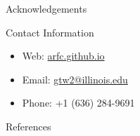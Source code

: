 \documentclass[final]{beamer}
\newlength{\onecolwid}
\newlength{\threecolwid}
\begin{document}
\begin{frame}[t]
\begin{columns}[t,totalwidth=\threecolwid]
\begin{column}{\onecolwid}
\begin{block}{Acknowledgements}
	
\end{block}





\begin{alertblock}{Contact Information}
	\begin{itemize}
		
		\item Web: \href{arfc.github.io}{arfc.github.io}
		\item Email: \href{mailto:gtw2@illinois.edu}{gtw2@illinois.edu}
		\item Phone: +1 (636) 284-9691
	\end{itemize}
	
\end{alertblock}

\begin{block}{References}

        {\footnotesize 
        }
\end{block}





\end{column} %

\end{columns} %

\end{frame} %
\end{document}

